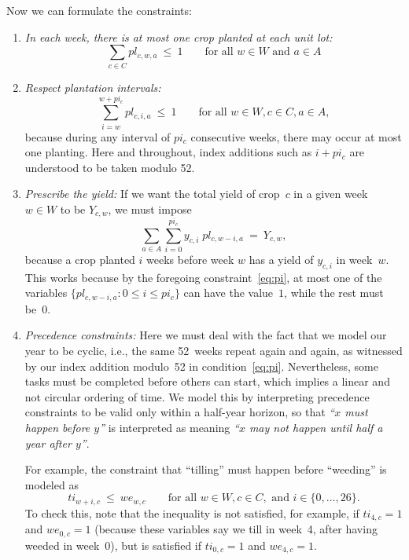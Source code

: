 \documentclass[11pt]{amsart}
\numberwithin{equation}{section}
\newcommand{\ojo}[1]{\textsf{\bfseries\boldmath{#1}}}
\begin{document}
Now  we can formulate the constraints:

\begin{enumerate}
\item \emph{In each week, there is at most one crop planted at each unit lot:}
\[
   \sum_{c\in C} pl_{c,w,a} \ \le \ 1
   \qquad\text{for all } w\in W \text{ and } a\in A
\]

\item\emph{Respect plantation intervals:}
\begin{equation}\label{eq:pi}
   \sum_{i=w}^{w+pi_c} pl_{c,i,a} \ \le \ 1
   \qquad\text{for all } w\in W, c\in C, a\in A,
\end{equation}
because during any interval of $pi_c$ consecutive weeks, there may
occur at most one planting.  Here and throughout, index additions such
as $i+pi_c$ are understood to be taken modulo 52.

\smallskip
\item\emph{Prescribe the yield:} If we want the total yield of crop~$c$ in
  a given week~$w\in W$ to be $Y_{c,w}$, we must impose
\[
    \sum_{a\in A} \sum_{i=0}^{pi_c} y_{c,i}\; pl_{c,w-i,a}
    \ = \
    Y_{c,w},
\]
because a crop planted $i$ weeks before week $w$ has a yield of
$y_{c,i}$ in week~$w$.  This works because by the foregoing
constraint~\eqref{eq:pi}, at most one of the variables
$\{pl_{c,w-i,a}:0\le i\le pi_c\}$ can have the value~$1$, while the rest must
be~$0$.

\smallskip
\item\emph{Precedence constraints:} Here we must deal with the fact
  that we model our year to be cyclic, i.e., the same 52~weeks repeat
  again and again, as witnessed by our index addition modulo~52 in
  condition~\eqref{eq:pi}. Nevertheless, some tasks must be completed
  before others can start, which implies a linear and not circular
  ordering of time. We model this by interpreting precedence
  constraints to be valid only within a half-year horizon, so
  that \emph{``$x$ must happen before $y$''} is interpreted as meaning
  \emph{``$x$ may not happen until half a year after $y$''}.

  For example, the constraint that ``tilling'' must happen before ``weeding''
  is modeled as
  \[
     ti_{w+i,c} \ \le \ we_{w,c}
     \qquad\text{for all } w\in W, c\in C, \text{ and }
     i\in\{0,\dots,26\}.
  \]
\ojo{this is still incorrect}
  To check this, note that the inequality is not satisfied, for
  example, if $ti_{4,c}=1$ and $we_{0,c}=1$ (because these variables
  say we till in week~4, after having weeded in week~0), but is
  satisfied if $ti_{0,c}=1$ and $we_{4,c}=1$.

\end{enumerate}
\end{document}
